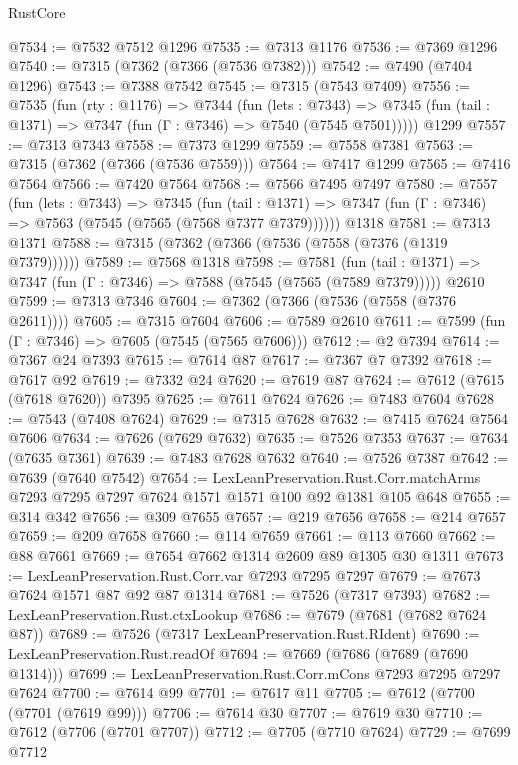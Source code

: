 \begin{lexlean}{RustCore}
\begin{coremodule}
@7534 := @7532 @7512 @1296
@7535 := @7313 @1176
@7536 := @7369 @1296
@7540 := @7315 (@7362 (@7366 (@7536 @7382)))
@7542 := @7490 (@7404 @1296)
@7543 := @7388 @7542
@7545 := @7315 (@7543 @7409)
@7556 := @7535
    (fun (rty : @1176) =>
    @7344
      (fun (lets : @7343) =>
      @7345 (fun (tail : @1371) => @7347 (fun (Γ : @7346) => @7540 (@7545 @7501)))))
    @1299
@7557 := @7313 @7343
@7558 := @7373 @1299
@7559 := @7558 @7381
@7563 := @7315 (@7362 (@7366 (@7536 @7559)))
@7564 := @7417 @1299
@7565 := @7416 @7564
@7566 := @7420 @7564
@7568 := @7566 @7495 @7497
@7580 := @7557
    (fun (lets : @7343) =>
    @7345
      (fun (tail : @1371) => @7347 (fun (Γ : @7346) => @7563 (@7545 (@7565 (@7568 @7377 @7379))))))
    @1318
@7581 := @7313 @1371
@7588 := @7315 (@7362 (@7366 (@7536 (@7558 (@7376 (@1319 @7379))))))
@7589 := @7568 @1318
@7598 := @7581
    (fun (tail : @1371) => @7347 (fun (Γ : @7346) => @7588 (@7545 (@7565 (@7589 @7379)))))
    @2610
@7599 := @7313 @7346
@7604 := @7362 (@7366 (@7536 (@7558 (@7376 @2611))))
@7605 := @7315 @7604
@7606 := @7589 @2610
@7611 := @7599 (fun (Γ : @7346) => @7605 (@7545 (@7565 @7606)))
@7612 := @2 @7394
@7614 := @7367 @24 @7393
@7615 := @7614 @87
@7617 := @7367 @7 @7392
@7618 := @7617 @92
@7619 := @7332 @24
@7620 := @7619 @87
@7624 := @7612 (@7615 (@7618 @7620)) @7395
@7625 := @7611 @7624
@7626 := @7483 @7604
@7628 := @7543 (@7408 @7624)
@7629 := @7315 @7628
@7632 := @7415 @7624 @7564 @7606
@7634 := @7626 (@7629 @7632)
@7635 := @7526 @7353
@7637 := @7634 (@7635 @7361)
@7639 := @7483 @7628 @7632
@7640 := @7526 @7387
@7642 := @7639 (@7640 @7542)
@7654 := LexLeanPreservation.Rust.Corr.matchArms
    @7293
    @7295
    @7297
    @7624
    @1571
    @1571
    @100
    @92
    @1381
    @105
    @648
@7655 := @314 @342
@7656 := @309 @7655
@7657 := @219 @7656
@7658 := @214 @7657
@7659 := @209 @7658
@7660 := @114 @7659
@7661 := @113 @7660
@7662 := @88 @7661
@7669 := @7654 @7662 @1314 @2609 @89 @1305 @30 @1311
@7673 := LexLeanPreservation.Rust.Corr.var @7293 @7295 @7297
@7679 := @7673 @7624 @1571 @87 @92 @87 @1314
@7681 := @7526 (@7317 @7393)
@7682 := LexLeanPreservation.Rust.ctxLookup
@7686 := @7679 (@7681 (@7682 @7624 @87))
@7689 := @7526 (@7317 LexLeanPreservation.Rust.RIdent)
@7690 := LexLeanPreservation.Rust.readOf
@7694 := @7669 (@7686 (@7689 (@7690 @1314)))
@7699 := LexLeanPreservation.Rust.Corr.mCons @7293 @7295 @7297 @7624
@7700 := @7614 @99
@7701 := @7617 @11
@7705 := @7612 (@7700 (@7701 (@7619 @99)))
@7706 := @7614 @30
@7707 := @7619 @30
@7710 := @7612 (@7706 (@7701 @7707))
@7712 := @7705 (@7710 @7624)
@7729 := @7699
    @7712

\end{coremodule}
\end{lexlean}
